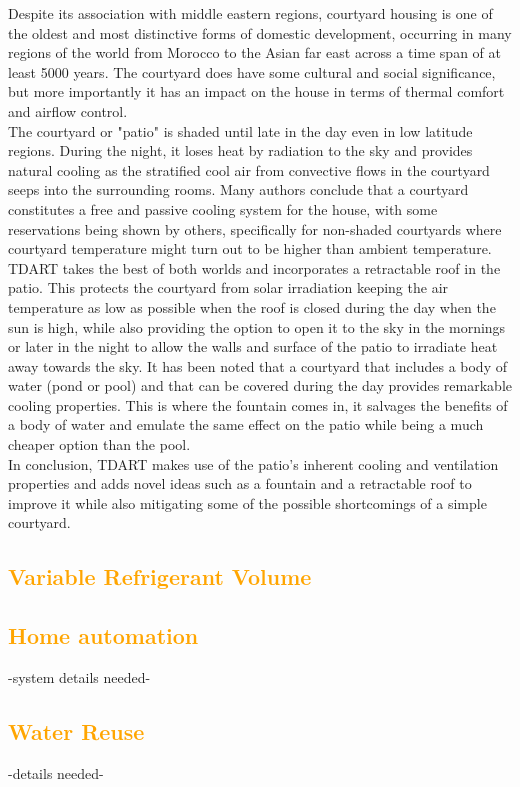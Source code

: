 \documentclass{tufte-book}
\begin{document}
	
	Despite its association with middle eastern regions, courtyard housing is one of the oldest and most distinctive forms of domestic development, occurring in many regions of the world from Morocco to the Asian far east across a time span of at least 5000 years\cite{edwards2006courtyard}. The courtyard does have some cultural and social significance, but more importantly it has an impact on the house in terms of thermal comfort and airflow control.\\
	The courtyard or "patio" is shaded until late in the day even in low latitude regions. During the night, it loses heat by radiation to the sky\cite{batty1991natural} and provides natural cooling as the stratified cool air from convective flows in the courtyard seeps into the surrounding rooms. Many authors\cite{scudo1988climatic,fathy1986natural} conclude that a courtyard constitutes a free and passive cooling system for the house, with some reservations being shown by others\cite{etzion1990thermal}, specifically for non-shaded courtyards where courtyard temperature might turn out to be higher than ambient temperature. TDART takes the best of both worlds and incorporates a retractable roof in the patio. This protects the courtyard from solar irradiation keeping the air temperature as low as possible when the roof is closed during the day when the sun is high, while also providing the option to open it to the sky in the mornings or later in the night to allow the walls and surface of the patio to irradiate heat away towards the sky. It has been noted that a courtyard that includes a body of water (pond or pool) and that can be covered during the day provides remarkable cooling properties\cite{al2001effect}. This is where the fountain comes in, it salvages the benefits of a body of water and emulate the same effect on the patio while being a much cheaper option than the pool.\\
	In conclusion, TDART makes use of the patio's inherent cooling and ventilation properties and adds novel ideas such as a fountain and a retractable roof to improve it while also mitigating some of the possible shortcomings of a simple courtyard.
	
	\textcolor{orange}{\chapter{Variable Refrigerant Volume}}
	
	\textcolor{orange}{\chapter{Home automation}}
	-system details needed-
	\textcolor{orange}{\chapter{Water Reuse}}
	-details needed-
	
	
	
	
\end{document}
